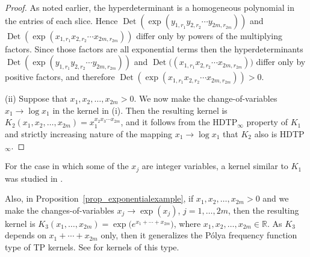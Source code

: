 \documentclass[pdftex]{sigma}
\numberwithin{equation}{section}
\def\R{{\mathbb R}}
\def\Det{\operatorname{Det}}
\begin{document}
\begin{proof}
As noted earlier, the hyperdeterminant is a homogeneous polynomial in the entries of each slice. Hence $\Det(\exp(y_{1,r_1} y_{2,r_2} \cdots y_{2m,r_{2m}}))$ and $\Det(\exp(x_{1,r_1} x_{2,r_2} \cdots x_{2m,r_{2m}}))$ differ only by powers of the multiplying factors. Since those factors are all exponential terms then the hyperdeterminants $\Det(\exp(y_{1,r_1} y_{2,r_2} \cdots y_{2m,r_{2m}}))$ and $\Det\bigl((x_{1,r_1} x_{2,r_2} \cdots x_{2m,r_{2m}}))$ differ only by positive factors, and therefore $\Det(\exp(x_{1,r_1} x_{2,r_2} \cdots x_{2m,r_{2m}})) > 0$.

(ii) Suppose that $x_1,x_2,\dots,x_{2m} > 0$. We now make the change-of-variables $x_1 \to \log x_1$ in the kernel in (i). Then the resulting kernel is $K_2(x_1,x_2,\dots,x_{2m}) = x_1^{x_2 x_3 \cdots x_{2m}}$, and it follows from the HDTP$_\infty$ property of $K_1$ and strictly increasing nature of the mapping $x_1 \to \log x_1$ that $K_2$ also is HDTP$_\infty$.
\end{proof}

\begin{Remark}
For the case in which some of the $x_j$ are integer variables, a kernel similar to $K_1$ was studied in \cite{wanglixu,xu}.

Also, in Proposition~\ref{prop_exponentialexample}, if $x_1,x_2,\dots,x_{2m} > 0$ and we make the changes-of-variables $x_j \to \exp(x_j)$, $j=1,\dots,2m$, then the resulting kernel is $K_3(x_1,\dots,x_{2m}) = \exp\bigl(e^{x_1 + \cdots + x_{2m}}\bigr)$, where $x_1,x_2,\dots,x_{2m} \in \R$. As $K_3$ depends on $x_1 + \cdots + x_{2m}$ only, then it generalizes the P\'olya frequency function type of TP kernels. See \cite{luquethibon,wanglixu,xu} for kernels of this type.
\end{Remark}
\end{document}
